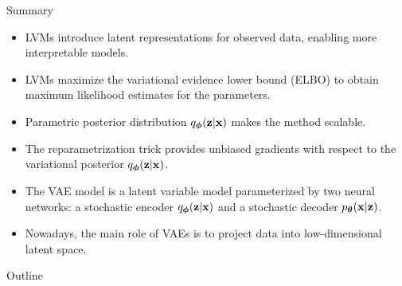 \documentclass{beamer}
\begin{document}
\begin{frame}{Summary}
	\begin{itemize}
		\item LVMs introduce latent representations for observed data, enabling more interpretable models.
		\vfill
		\item LVMs maximize the variational evidence lower bound (ELBO) to obtain maximum likelihood estimates for the parameters.
		\vfill
		\item Parametric posterior distribution $q_{\boldsymbol{\phi}}(\mathbf{z}| \mathbf{x})$ makes the method scalable.
		\vfill
		\item The reparametrization trick provides unbiased gradients with respect to the variational posterior $q_{\boldsymbol{\phi}}(\mathbf{z}| \mathbf{x})$.
		\vfill
		\item The VAE model is a latent variable model parameterized by two neural networks: a stochastic encoder $q_{\boldsymbol{\phi}}(\mathbf{z}| \mathbf{x})$ and a stochastic decoder $p_{\boldsymbol{\theta}}(\mathbf{x} | \mathbf{z})$.
		\vfill
		\item Nowadays, the main role of VAEs is to project data into low-dimensional latent space.
	\end{itemize}
\end{frame}


\begin{frame}
	\titlepage
	\resetonslide
\end{frame}







\begin{frame}{Outline}
	\tableofcontents
\end{frame}
\end{document}
